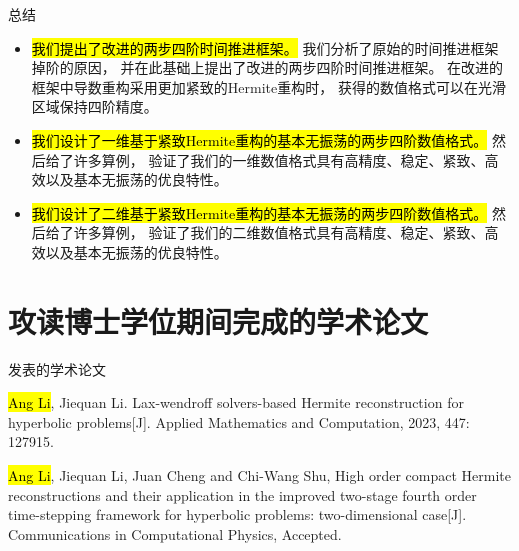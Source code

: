 \documentclass[aspectratio=169]{beamer}
\begin{document}
\begin{frame}{总结}
  
  \begin{itemize}[<+->]
    \item \hl{我们提出了改进的两步四阶时间推进框架。}
          我们分析了原始的时间推进框架掉阶的原因，
          并在此基础上提出了改进的两步四阶时间推进框架。
          在改进的框架中导数重构采用更加紧致的Hermite重构时，
          获得的数值格式可以在光滑区域保持四阶精度。
    \item \hl{我们设计了一维基于紧致Hermite重构的基本无振荡的两步四阶数值格式。}
          然后给了许多算例，
          验证了我们的一维数值格式具有高精度、稳定、紧致、高效以及基本无振荡的优良特性。
    \item \hl{我们设计了二维基于紧致Hermite重构的基本无振荡的两步四阶数值格式。}
          然后给了许多算例，
          验证了我们的二维数值格式具有高精度、稳定、紧致、高效以及基本无振荡的优良特性。
  \end{itemize}
  
\end{frame}

\section*{攻读博士学位期间完成的学术论文}

\begin{frame}{发表的学术论文}
  
  \begin{list}{[]}
    {
      \setlength{\leftmargin}{2.5em}
      \setlength{\labelsep}{1em}
      \setlength{\itemsep}{3ex}
    }
    
    \item \hl{Ang Li}, Jiequan Li. Lax-wendroff solvers-based Hermite reconstruction for hyperbolic problems[J]. Applied Mathematics and Computation, 2023, 447: 127915.
          
    \item \hl{Ang Li}, Jiequan Li, Juan Cheng and Chi-Wang Shu, High order compact Hermite reconstructions and their application in the improved two-stage fourth order time-stepping framework for hyperbolic problems: two-dimensional case[J]. Communications in Computational Physics, Accepted.
  \end{list}
  
\end{frame}

\end{document}
